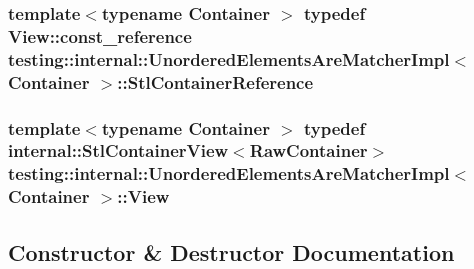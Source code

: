 \subsubsection[{\texorpdfstring{Stl\+Container\+Reference}{StlContainerReference}}]{\setlength{\rightskip}{0pt plus 5cm}template$<$typename Container $>$ typedef {\bf View\+::const\+\_\+reference} {\bf testing\+::internal\+::\+Unordered\+Elements\+Are\+Matcher\+Impl}$<$ Container $>$\+::{\bf Stl\+Container\+Reference}}\hypertarget{classtesting_1_1internal_1_1UnorderedElementsAreMatcherImpl_acf64d0e328361d4796bcf1aeb91ed975}{}\label{classtesting_1_1internal_1_1UnorderedElementsAreMatcherImpl_acf64d0e328361d4796bcf1aeb91ed975}
\subsubsection[{\texorpdfstring{View}{View}}]{\setlength{\rightskip}{0pt plus 5cm}template$<$typename Container $>$ typedef {\bf internal\+::\+Stl\+Container\+View}$<$Raw\+Container$>$ {\bf testing\+::internal\+::\+Unordered\+Elements\+Are\+Matcher\+Impl}$<$ Container $>$\+::{\bf View}}\hypertarget{classtesting_1_1internal_1_1UnorderedElementsAreMatcherImpl_adbd6dfef7713dd30d569b4220eb808d3}{}\label{classtesting_1_1internal_1_1UnorderedElementsAreMatcherImpl_adbd6dfef7713dd30d569b4220eb808d3}


\subsection{Constructor \& Destructor Documentation}
